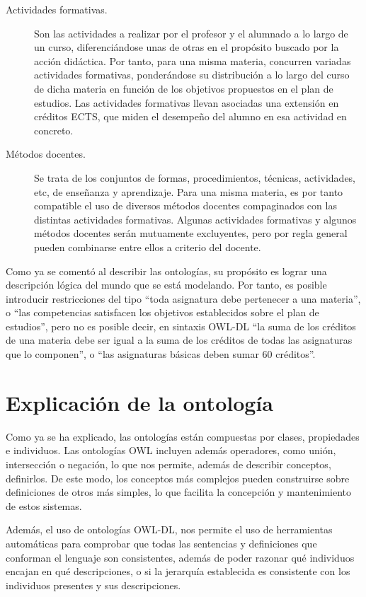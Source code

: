 \begin{description}
	\item [Actividades formativas.]Son las actividades a realizar por el profesor y el alumnado a lo largo de un curso, diferenciándose unas de otras en el propósito buscado por la acción didáctica. Por tanto, para una misma materia, concurren variadas actividades formativas, ponderándose su distribución a lo largo del curso de dicha materia en función de los objetivos propuestos en el plan de estudios. Las actividades formativas llevan asociadas una extensión en créditos ECTS, que miden el desempeño del alumno en esa actividad en concreto.
 
	\item [Métodos docentes.]Se trata de los conjuntos de formas, procedimientos, técnicas, actividades, etc, de enseñanza y aprendizaje. Para una misma materia, es por tanto compatible el uso de diversos métodos docentes compaginados con las distintas actividades formativas. Algunas actividades formativas y algunos métodos docentes serán mutuamente excluyentes, pero por regla general pueden combinarse entre ellos a criterio del docente. 
 
\end{description}
    
Como ya se comentó al describir las ontologías, su propósito es lograr una descripción lógica del mundo que se está modelando. Por tanto, es posible introducir restricciones del tipo ``toda asignatura debe pertenecer a una materia'', o ``las competencias satisfacen los objetivos establecidos sobre el plan de estudios'', pero no es posible decir, en sintaxis OWL-DL ``la suma de los créditos de una materia debe ser igual a la suma de los créditos de todas las asignaturas que lo componen'', o ``las asignaturas básicas deben sumar 60 créditos''. 	

\section{Explicación de la ontología}

Como ya se ha explicado, las ontologías están compuestas por clases, propiedades e individuos. Las ontologías OWL incluyen además operadores, como unión, intersección o negación, lo que nos permite, además de describir conceptos, definirlos. De este modo, los conceptos más complejos pueden construirse sobre definiciones de otros más simples, lo que facilita la concepción y mantenimiento de estos sistemas. 

Además, el uso de ontologías OWL-DL, nos permite el uso de herramientas automáticas para comprobar que todas las sentencias y definiciones que conforman el lenguaje son consistentes, además de poder razonar qué individuos encajan en qué descripciones, o si la jerarquía establecida es consistente con los individuos presentes y sus descripciones.

